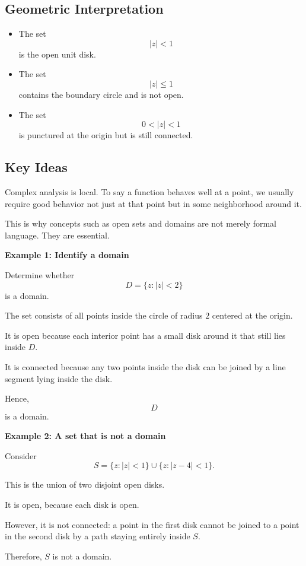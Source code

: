 \subsection*{Geometric Interpretation}

\begin{itemize}
    \item The set
          \[
              |z|<1
          \]
          is the open unit disk.
    \item The set
          \[
              |z|\le 1
          \]
          contains the boundary circle and is not open.
    \item The set
          \[
              0<|z|<1
          \]
          is punctured at the origin but is still connected.
\end{itemize}

\subsection*{Key Ideas}

\begin{conceptbox}
    Complex analysis is local. To say a function behaves well at a point, we usually require good behavior not just at that point but in some neighborhood around it.
\end{conceptbox}

This is why concepts such as open sets and domains are not merely formal language. They are essential.

\begin{examplebox}
    \textbf{Example 1: Identify a domain}

    Determine whether
    \[
        D=\{z: |z|<2\}
    \]
    is a domain.

    The set consists of all points inside the circle of radius $2$ centered at the origin.

    It is open because each interior point has a small disk around it that still lies inside $D$.

    It is connected because any two points inside the disk can be joined by a line segment lying inside the disk.

    Hence,
    \[
        D
    \]
    is a domain.
\end{examplebox}

\begin{examplebox}
    \textbf{Example 2: A set that is not a domain}

    Consider
    \[
        S=\{z: |z|<1\}\cup\{z: |z-4|<1\}.
    \]

    This is the union of two disjoint open disks.

    It is open, because each disk is open.

    However, it is not connected: a point in the first disk cannot be joined to a point in the second disk by a path staying entirely inside $S$.

    Therefore, $S$ is not a domain.
\end{examplebox}

